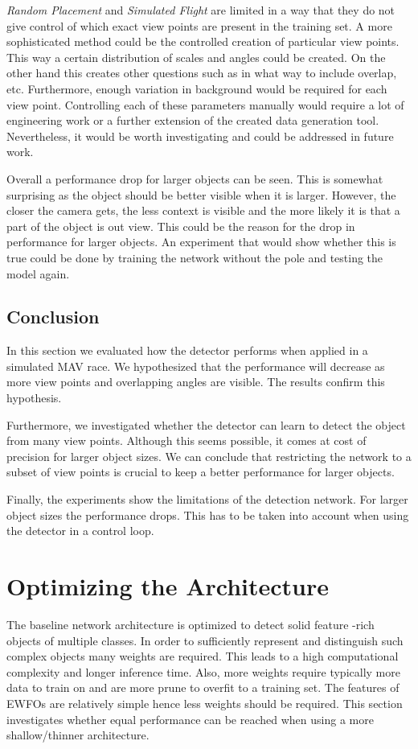 \textit{Random Placement} and \textit{Simulated Flight} are limited in a way that they do not give control of which exact view points are present in the training set. A more sophisticated method could be the controlled creation of particular view points. This way a certain distribution of scales and angles could be created. On the other hand this creates other questions such as in what way to include overlap, etc. Furthermore, enough variation in background would be required for each view point. Controlling each of these parameters manually would require a lot of engineering work or a further extension of the created data generation tool. Nevertheless, it would be worth investigating and could be addressed in future work.

Overall a performance drop for larger objects can be seen. This is somewhat surprising as the object should be better visible when it is larger. However, the closer the camera gets, the less context is visible and the more likely it is that a part of the object is out view. This could be the reason for the drop in performance for larger objects. An experiment that would show whether this is true could be done by training the network without the pole and testing the model again.

\subsection{Conclusion}

In this section we evaluated how the detector performs when applied in a simulated \ac{MAV} race. We hypothesized that the performance will decrease as more view points and overlapping angles are visible. The results confirm this hypothesis.

Furthermore, we investigated whether the detector can learn to detect the object from many view points. Although this seems possible, it comes at cost of precision for larger object sizes. We can conclude that restricting the network to a subset of view points is crucial to keep a better performance for larger objects.

Finally, the experiments show the limitations of the detection network. For larger object sizes the performance drops. This has to be taken into account when using the detector in a control loop.

\section{Optimizing the Architecture}
\label{sec:exp_arch}
The baseline network architecture is optimized to detect solid feature -rich objects of multiple classes. In order to sufficiently represent and distinguish such complex objects many weights are required. This leads to a high computational complexity and longer inference time. Also, more weights require typically more data to train on and are more prune to overfit to a training set. The features of \acp{EWFO} are relatively simple hence less weights should be required. This section investigates whether equal performance can be reached when using a more shallow/thinner architecture.

